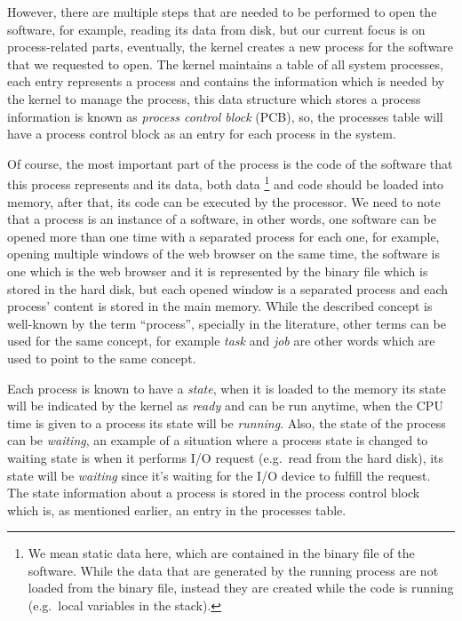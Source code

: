 However, there are multiple steps that are needed to be performed to
open the software, for example, reading its data from disk, but our
current focus is on process-related parts, eventually, the kernel
creates a new process for the software that we requested to open. The
kernel maintains a table of all system processes, each entry represents
a process and contains the information which is needed by the kernel to
manage the process, this data structure which stores a process
information is known as \emph{process control block} (PCB), so, the
processes table will have a process control block as an entry for each
process in the system.

Of course, the most important part of the process is the code of the
software that this process represents and its data, both data \footnote{We
  mean static data here, which are contained in the binary file of the
  software. While the data that are generated by the running process are
  not loaded from the binary file, instead they are created while the
  code is running (e.g.~local variables in the stack).} and code should
be loaded into memory, after that, its code can be executed by the
processor. We need to note that a process is an instance of a software,
in other words, one software can be opened more than one time with a
separated process for each one, for example, opening multiple windows of
the web browser on the same time, the software is one which is the web
browser and it is represented by the binary file which is stored in the
hard disk, but each opened window is a separated process and each
process' content is stored in the main memory. While the described
concept is well-known by the term ``process'', specially in the
literature, other terms can be used for the same concept, for example
\emph{task} and \emph{job} are other words which are used to point to
the same concept.

Each process is known to have a \emph{state}, when it is loaded to the
memory its state will be indicated by the kernel as \emph{ready} and can
be run anytime, when the CPU time is given to a process its state will
be \emph{running}. Also, the state of the process can be \emph{waiting},
an example of a situation where a process state is changed to waiting
state is when it performs I/O request (e.g.~read from the hard disk),
its state will be \emph{waiting} since it's waiting for the I/O device
to fulfill the request. The state information about a process is stored
in the process control block which is, as mentioned earlier, an entry in
the processes table.


